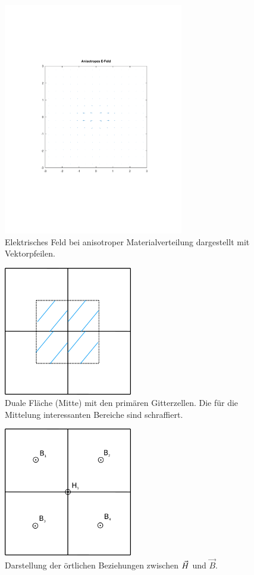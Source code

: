 \documentclass[Protokollheft.tex]{subfiles}
\begin{document}
\begin{figure}[h!]
	\centering
	\includegraphics[trim = 10mm 60mm 10mm 50mm, clip, width=0.7\textwidth]{efield_4.pdf}
	\caption{Elektrisches Feld bei anisotroper Materialverteilung dargestellt mit Vektorpfeilen.}
	\label{Abb:72}
\end{figure}
\begin{figure}[h!]
	\centering
	\includegraphics[trim = 0mm 0mm 0mm 0mm, clip, width=0.5\textwidth]{Ausarbeitung1.png}
	\caption{Duale Fläche (Mitte) mit den primären Gitterzellen. Die für die Mittelung interessanten Bereiche sind schraffiert.}
	\label{Abb:A1}
\end{figure}
\begin{figure}[h!]
	\centering
	\includegraphics[trim = 0mm 0mm 0mm 0mm, clip, width=0.5\textwidth]{Ausarbeitung2.png}
	\caption{Darstellung der örtlichen Beziehungen zwischen $ \vec{H} $ und $\vec{B}$.}
	\label{Abb:A1}
\end{figure}
\end{document}
